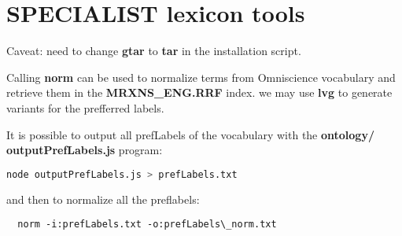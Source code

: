 \documentclass[a4paper,11pt]{report}
\newcommand{\cs}[1]{{\bfseries \ttfamily #1}}
\begin{document}
\section{SPECIALIST lexicon tools}
Caveat: need to change \cs{gtar} to \cs{tar} in the installation script.

Calling \cs{norm} can be used to normalize terms from Omniscience vocabulary and retrieve them in the \cs{MRXNS\_ENG.RRF} index. we may use \cs{lvg} to generate variants for the prefferred labels.

It is possible to output all prefLabels of the vocabulary with the \cs{ontology/
outputPrefLabels.js} program:
\begin{lstlisting}[language=bash]
  node outputPrefLabels.js > prefLabels.txt
\end{lstlisting}
and then to normalize all the preflabels:
\begin{lstlisting}
  norm -i:prefLabels.txt -o:prefLabels\_norm.txt
\end{lstlisting}
\end{document}
